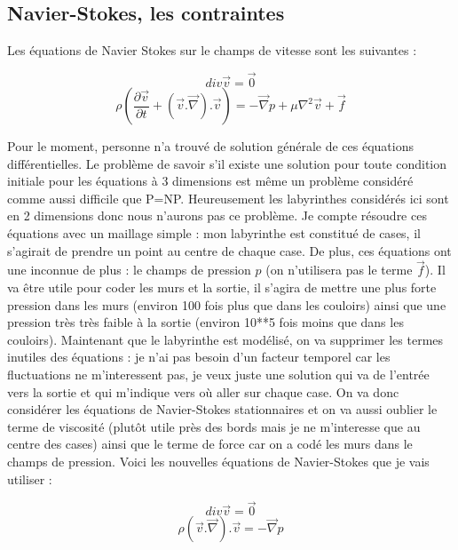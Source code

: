 \documentclass[12pt]{article}
\begin{document}
\subsection{Navier-Stokes, les contraintes}
Les équations de Navier Stokes sur le champs de vitesse sont les suivantes :

\[div \overrightarrow{v} = \overrightarrow{0}\]
\[\rho(\frac{\partial \overrightarrow{v}}{\partial t} + (\overrightarrow{v}.\overrightarrow{\nabla}). \overrightarrow{v}) = -\overrightarrow{\nabla} p + \mu \nabla^2\overrightarrow{v} +\overrightarrow{f}\]

Pour le moment, personne n'a trouvé de solution générale de ces équations différentielles. Le problème de savoir s'il existe une solution pour toute condition initiale pour les équations à 3 dimensions est même un problème considéré comme aussi difficile que P=NP. Heureusement les labyrinthes considérés ici sont en 2 dimensions donc nous n'aurons pas ce problème. Je compte résoudre ces équations avec un maillage simple : mon labyrinthe est constitué de cases, il s'agirait de prendre un point au centre de chaque case. De plus, ces équations ont une inconnue de plus : le champs de pression $p$ (on n'utilisera pas le terme $\overrightarrow{f}$). Il va être utile pour coder les murs et la sortie, il s'agira de mettre une plus forte pression dans les murs (environ 100 fois plus que dans les couloirs) ainsi que une pression très très faible à la sortie (environ 10**5 fois moins que dans les couloirs). Maintenant que le labyrinthe est modélisé, on va supprimer les termes inutiles des équations : je n'ai pas besoin d'un facteur temporel car les fluctuations ne m'interessent pas, je veux juste une solution qui va de l'entrée vers la sortie et qui m'indique vers où aller sur chaque case. On va donc considérer les équations de Navier-Stokes stationnaires et on va aussi oublier le terme de viscosité (plutôt utile près des bords mais je ne m'interesse que au centre des cases) ainsi que le terme de force car on a codé les murs dans le champs de pression. Voici les nouvelles équations de Navier-Stokes que je vais utiliser :

\[div \overrightarrow{v} = \overrightarrow{0}\]
\[\rho (\overrightarrow{v}.\overrightarrow{\nabla}).\overrightarrow{v}  = -\overrightarrow{\nabla} p \]
\end{document}
